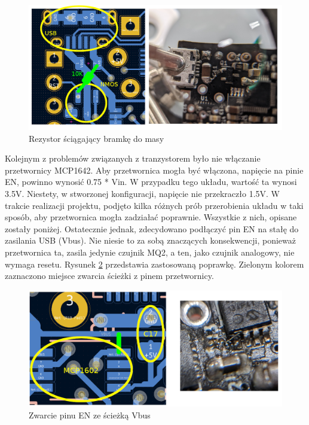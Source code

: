\begin{figure}[H]
    \centering
    \includegraphics[width=\textwidth, height=\textheight, keepaspectratio]{Graphics/fix_gate.png}
    \caption{Rezystor ściągający bramkę do masy}
    \label{img:fix_gate}
\end{figure}
Kolejnym z problemów związanych z tranzystorem było nie włączanie przetwornicy MCP1642. Aby przetwornica mogła być włączona, napięcie na pinie EN, powinno wynosić 0.75 * Vin\cite{mcp_datasheet}. W przypadku tego układu, wartość ta wynosi 3.5V. Niestety, w stworzonej konfiguracji, napięcie nie przekraczło 1.5V. W trakcie realizacji projektu, podjęto kilka różnych prób przerobienia układu w taki sposób, aby przetwornica mogła zadziałać poprawnie. Wszystkie z nich, opisane zostały poniżej. Ostatecznie jednak, zdecydowano podłączyć pin EN na stałę do zasilania USB (Vbus). Nie niesie to za sobą znaczących konsekwencji, ponieważ przetwornica ta, zasila jedynie czujnik MQ2, a ten, jako czujnik analogowy, nie wymaga resetu. Rysunek \ref{img:fix_mcp1642} przedstawia zastosowaną poprawkę. Zielonym kolorem zaznaczono miejsce zwarcia ścieżki z pinem przetwornicy.
\begin{figure}[H]
    \centering
    \includegraphics[width=\textwidth, height=\textheight, keepaspectratio]{Graphics/fix_mcp1602.png}
    \caption{Zwarcie pinu EN ze ścieżką Vbus}
    \label{img:fix_mcp1642}
\end{figure}
